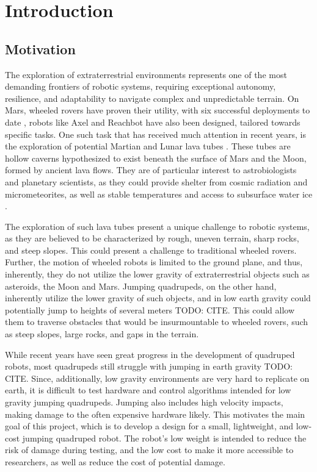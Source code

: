 \section{Introduction}

\subsection{Motivation}
\label{sec:motivation}

The exploration of extraterrestrial environments represents one of the most demanding frontiers of robotic systems, requiring exceptional autonomy, resilience, and adaptability to navigate complex and unpredictable terrain. On Mars, wheeled rovers have proven their utility, with six successful deployments to date \cite{mars_rovers_x6}, robots like Axel \cite{Axel} and Reachbot \cite{ReachBot} have also been designed, tailored towards specific tasks. One such task that has received much attention in recent years, is the exploration of potential Martian and Lunar lava tubes \cite{lavatubes}. These tubes are hollow caverns hypothesized to exist beneath the surface of Mars and the Moon, formed by ancient lava flows. They are of particular interest to astrobiologists and planetary scientists, as they could provide shelter from cosmic radiation and micrometeorites, as well as stable temperatures and access to subsurface water ice \cite{lavatubes}.

The exploration of such lava tubes present a unique challenge to robotic systems, as they are believed to be characterized by rough, uneven terrain, sharp rocks, and steep slopes. This could present a challenge to traditional wheeled rovers. Further, the motion of wheeled robots is limited to the ground plane, and thus, inherently, they do not utilize the lower gravity of extraterrestrial objects such as asteroids, the Moon and Mars. Jumping quadrupeds, on the other hand, inherently utilize the lower gravity of such objects, and in low earth gravity could potentially jump to heights of several meters TODO: CITE. This could allow them to traverse obstacles that would be insurmountable to wheeled rovers, such as steep slopes, large rocks, and gaps in the terrain.

While recent years have seen great progress in the development of quadruped robots, most quadrupeds still struggle with jumping in earth gravity TODO: CITE. Since, additionally, low gravity environments are very hard to replicate on earth, it is difficult to test hardware and control algorithms intended for low gravity jumping quadrupeds. Jumping also includes high velocity impacts, making damage to the often expensive hardware likely. This motivates the main goal of this project, which is to develop a design for a small, lightweight, and low-cost jumping quadruped robot. The robot's low weight is intended to reduce the risk of damage during testing, and the low cost to make it more accessible to researchers, as well as reduce the cost of potential damage.

